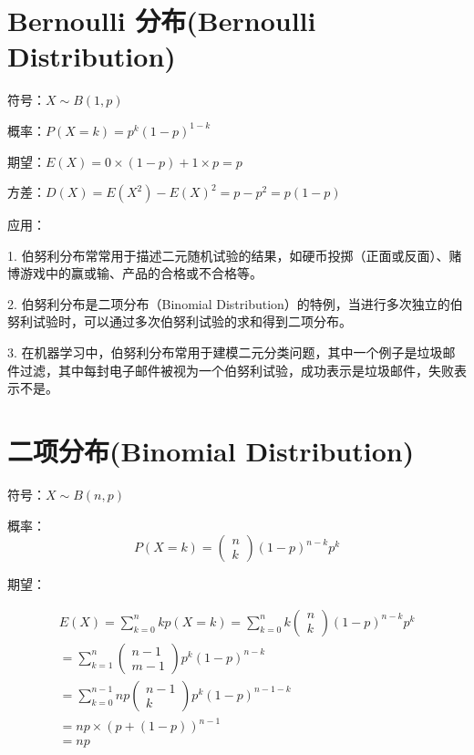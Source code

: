 \documentclass[12pt, a4paper, oneside]{ctexbook}
\begin{document}
\section{Bernoulli 分布(Bernoulli Distribution)}

符号：$X \sim B(1, p)$

概率：$P(X = k) = p^{k}(1-p)^{1-k}$

期望：$E(X) = 0\times (1-p) + 1 \times p = p$ 

方差：$D(X) = E(X^{2}) - E(X)^{2} = p - p^2 = p(1-p)$

应用：

1. 伯努利分布常常用于描述二元随机试验的结果，如硬币投掷（正面或反面）、赌博游戏中的赢或输、产品的合格或不合格等。

2. 伯努利分布是二项分布（Binomial Distribution）的特例，当进行多次独立的伯努利试验时，可以通过多次伯努利试验的求和得到二项分布。

3. 在机器学习中，伯努利分布常用于建模二元分类问题，其中一个例子是垃圾邮件过滤，其中每封电子邮件被视为一个伯努利试验，成功表示是垃圾邮件，失败表示不是。

\section{二项分布(Binomial Distribution)}

 符号：$X\sim B(n, p)$
 
 概率：
$$
P(X = k) = \begin{pmatrix}
n \\
k
\end{pmatrix} (1-p)^{n - k}p^k
$$

期望：

\begin{align*}
    E(X)= \sum\limits_{k = 0}^{n}kp(X = k) =\sum\limits_{k = 0}^{n} k\begin{pmatrix}
n \\
k
\end{pmatrix} (1-p)^{n - k}p^k \\
= \sum\limits_{k = 1}^{n}\begin{pmatrix} n - 1\\ m - 1\end{pmatrix}p^{k}(1-p)^{n - k} \quad \quad \quad \\
= \sum\limits_{k = 0}^{n - 1}np\begin{pmatrix}n - 1 \\ k \end{pmatrix} p^{k}(1-p)^{n - 1 - k} \quad \\
= np\times (p + (1 - p))^{n - 1} \quad \quad \quad \quad \quad  \\
= np \quad \quad \quad \quad \quad \quad \quad \quad \quad \quad \quad \quad \quad
\end{align*}
\end{document}
